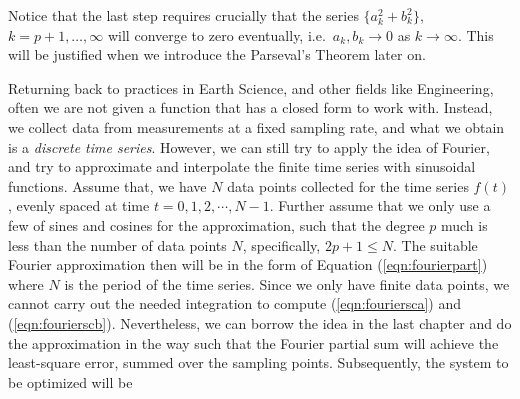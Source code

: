 Notice that the last step requires crucially that the series $\{a_k^2 + b_k^2\}$, $k = p+1, \ldots, \infty$ will converge to zero eventually, i.e.\ $a_k, b_k \to 0$ as $k \to \infty$. This will be justified when we introduce the Parseval's Theorem later on. \par
Returning back to practices in Earth Science, and other fields like Engineering, often we are not given a function that has a closed form to work with. Instead, we collect data from measurements at a fixed sampling rate, and what we obtain is a \textit{discrete time series}. However, we can still try to apply the idea of Fourier, and try to approximate and interpolate the finite time series with sinusoidal functions. Assume that, we have $N$ data points collected for the time series $f(t)$, evenly spaced at time $t = 0, 1, 2, \cdots, N-1$. Further assume that we only use a few of sines and cosines for the approximation, such that the degree $p$ much is less than the number of data points $N$, specifically, $2p+1 \leq N$. The suitable Fourier approximation then will be in the form of Equation (\ref{eqn:fourierpart}) where $N$ is the period of the time series. Since we only have finite data points, we cannot carry out the needed integration to compute (\ref{eqn:fouriersca}) and (\ref{eqn:fourierscb}). Nevertheless, we can borrow the idea in the last chapter and do the approximation in the way such that the Fourier partial sum will achieve the least-square error, summed over the sampling points. Subsequently, the system to be optimized will be
